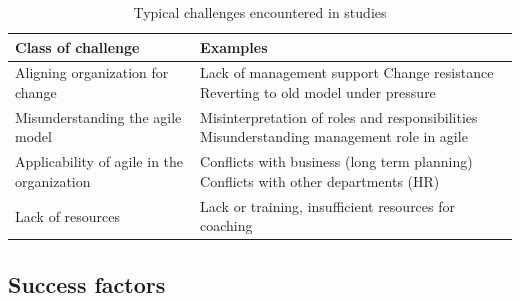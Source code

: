\documentclass[lnbip]{svmultln}
\begin{document}
\begin{table}[h]
    \begin{tabular}{ p{} p{} }
        \toprule
        Class of challenge  & Examples   \\ \midrule
        
        \raggedright Aligning organization for change  &
             Lack of management support \newline
             Change resistance \newline
             Reverting to old model under pressure \\ 
        
        \raggedright\rule{0pt}{0.4cm}Misunderstanding the agile model  &
             Misinterpretation of roles and responsibilities \newline
             Misunderstanding management role in agile \\
        
        \raggedright\rule{0pt}{0.4cm}Applicability of agile in the organization  &
            Conflicts with business (long term planning) \newline
            Conflicts with other departments (HR) \\
        
        \raggedright\rule{0pt}{0.4cm}Lack of resources  &
            Lack or training, insufficient resources for coaching \\
        \bottomrule
    \end{tabular}
    \caption{Typical challenges encountered in studies}
    \label{table:challenge}
\end{table}


\subsection{Success factors}
\end{document}
